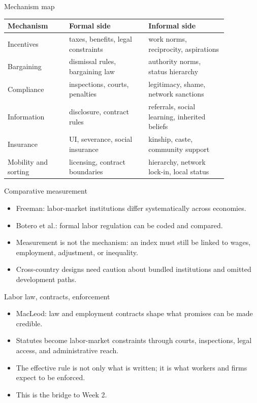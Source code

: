\documentclass[aspectratio=169,11pt]{beamer}
\begin{document}
\begin{frame}{Mechanism map}
\small
\begin{tabular}{p{0.24\linewidth} p{0.31\linewidth} p{0.31\linewidth}}
\toprule
Mechanism & Formal side & Informal side \\
\midrule
Incentives & taxes, benefits, legal constraints & work norms, reciprocity, aspirations \\
Bargaining & dismissal rules, bargaining law & authority norms, status hierarchy \\
Compliance & inspections, courts, penalties & legitimacy, shame, network sanctions \\
Information & disclosure, contract rules & referrals, social learning, inherited beliefs \\
Insurance & UI, severance, social insurance & kinship, caste, community support \\
Mobility and sorting & licensing, contract boundaries & hierarchy, network lock-in, local status \\
\bottomrule
\end{tabular}
\end{frame}

\begin{frame}{Comparative measurement}
\begin{itemize}
    \item Freeman: labor-market institutions differ systematically across economies.
    \item Botero et al.: formal labor regulation can be coded and compared.
    \item Measurement is not the mechanism: an index must still be linked to wages, employment, adjustment, or inequality.
    \item Cross-country designs need caution about bundled institutions and omitted development paths.
\end{itemize}
\end{frame}

\begin{frame}{Labor law, contracts, enforcement}
\begin{itemize}
    \item MacLeod: law and employment contracts shape what promises can be made credible.
    \item Statutes become labor-market constraints through courts, inspections, legal access, and administrative reach.
    \item The effective rule is not only what is written; it is what workers and firms expect to be enforced.
    \item This is the bridge to Week 2.
\end{itemize}
\end{frame}
\end{document}
